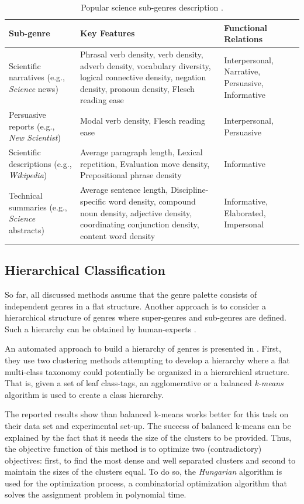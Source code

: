 \begin{table}[t]
	\center
	\caption {Popular science sub-genres description \parencite{lieungnapar2017genre}.}\label{chap:relevant_work:tbl:pop_science_registers_features}
	\begin{tabular}{p{3.5cm}p{7cm}p{2cm}}
		\hline
		Sub-genre & Key Features & Functional Relations \\
		\hline
		 Scientific narratives (e.g., \textit{Science} news) & Phrasal verb density, verb density, adverb density, vocabulary diversity, logical connective density, negation density, pronoun density, Flesch reading ease & Interpersonal, Narrative, Persuasive, Informative \\
         Persuasive reports (e.g., \textit{New Scientist}) & Modal verb density, Flesch reading ease & Interpersonal, Persuasive \\
         Scientific descriptions (e.g., \textit{Wikipedia}) & Average paragraph length, Lexical repetition, Evaluation move density, Prepositional phrase density & Informative\\
         Technical summaries (e.g., \textit{Science} abstracts)  & Average sentence length, Discipline-specific word density, compound noun density, adjective density, coordinating conjunction density, content word density & Informative, Elaborated, Impersonal  \\
  		\hline
	\end{tabular}
\end{table}

\subsection{Hierarchical Classification} 

So far, all discussed methods assume that the genre palette consists of independent genres in a flat structure. Another approach is to consider a hierarchical structure of genres where super-genres and sub-genres are defined. Such a hierarchy can be obtained by human-experts \parencite{stubbe2007genre}.

An automated approach to build a hierarchy of genres is presented in \parencite{madjarov2015web}. First, they use two clustering methods attempting to develop a hierarchy where a flat multi-class taxonomy could potentially be organized in a hierarchical structure. That is, given a set of  leaf class-tags, an agglomerative or a balanced \textit{k-means} algorithm is used to create a class hierarchy. 

The reported results show than balanced k-means works better for this task on their data set and experimental set-up. The success of balanced k-means can be explained by the fact that it needs the size of the clusters to be provided. Thus, the objective function of this method is to optimize two (contradictory) objectives: first, to find the most dense and well separated clusters and second to maintain the sizes of the clusters equal. To do so, the \textit{Hungarian} algorithm is used for the optimization process, a combinatorial optimization algorithm that solves the assignment problem in polynomial time.

